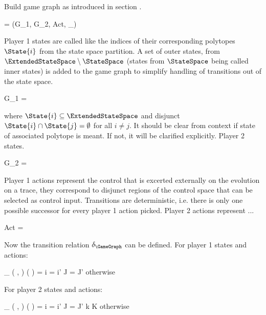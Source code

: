 Build game graph as introduced in section .

\startformula
    \GameGraph = (G_1, G_2, Act, \delta_\GameGraph)
\stopformula

Player 1 states are called like the indices of their corresponding polytopes $\State{i}$ from the state space partition.
A set of outer states, from $\ExtendedStateSpace \setminus \StateSpace$ (states from $\StateSpace$ being called inner states) is added to the game graph to simplify handling of transitions out of the state space.

\startformula
    G_1 = 
\stopformula

where $\State{i} \subseteq \ExtendedStateSpace$ and disjunct $\State{i} \cap \State{j} = \emptyset$ for all $i \neq j$.  
It should be clear from context if state of associated polytope is meant.
If not, it will be clarified explicitly.
Player 2 states.

\startformula
    G_2 = 
\stopformula

Player 1 actions represent the control that is excerted externally on the evolution on a trace, they correspond to disjunct regions of the control space that can be selected as control input.
Transitions are deterministic, i.e. there is only one possible successor for every player 1 action picked.
Player 2 actions represent ...

\startformula
    Act =  \,\cup\,
\stopformula

Now the transition relation $\delta_\GameGraph$ can be defined.
For player 1 states and actions:

\startformula
    \delta_\GameGraph
        \Big( ,  \Big)
        \Big(  \Big)
    = \startmathcases
        \MC \startgathered
                \NC i = i' \MidAnd J = J'
                \NR
                \NC \quad \MidAnd {} \neq \emptyset
                \NR
            \stopgathered
        \NR
        \NC otherwise \EndPeriod
        \NR
    \stopmathcases
\stopformula

For player 2 states and actions:

\startformula
    \delta_\GameGraph
        \Big( ,  \Big)
        \Big(  \Big)
    = \startmathcases
        \NC \displaystyle{}
        \MC \startgathered
                \NC i = i' \MidAnd J = J' \MidAnd k \in K
                \NR
                \NC \quad \MidAnd {} \neq \emptyset
                \NR
            \stopgathered
        \NR
        \NC otherwise \EndComma
        \NR
    \stopmathcases
\stopformula

